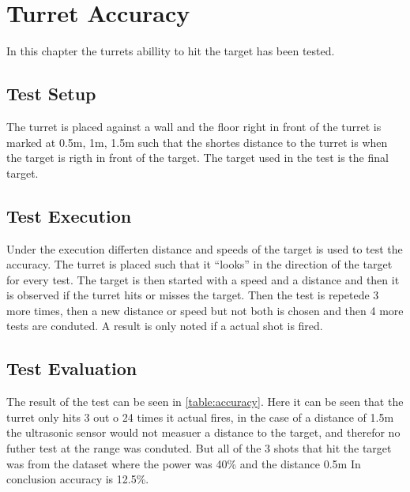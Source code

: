 \chapter{Turret Accuracy}\label{TurretAcc}
In this chapter the turrets abillity to hit the target has been tested.

\section{Test Setup}
The turret is placed against a wall and the floor right in front of the turret
is marked at 0.5m, 1m, 1.5m such that the shortes distance to the turret is when
the target is rigth in front of the target. The target used in the test is the final
target.

\section{Test Execution}
Under the execution differten distance and speeds of the target is used to test
the accuracy. The turret is placed such that it ``looks'' in the direction of
the target for every test. The target is then started with a speed and a
distance and then it is observed if the turret hits or misses the target. Then
the test is repetede 3 more times, then a new distance or speed but not both is
chosen and then 4 more tests are conduted. A result is only noted if a actual
shot is fired. 

\section{Test Evaluation}
The result of the test can be seen in \autoref{table:accuracy}. Here it can be
seen that the turret only hits 3 out o 24 times it actual fires, in the case of
a distance of 1.5m the ultrasonic sensor would not measuer a distance to the
target, and therefor no futher test at the range was conduted. But all of the
3 shots that hit the target was from
the dataset where the power was 40\% and the distance 0.5m  In conclusion \names
accuracy is 12.5\%.

